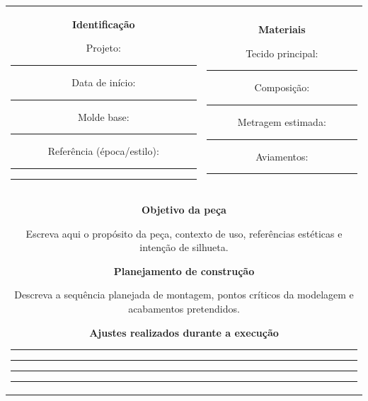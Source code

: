 \documentclass[
  10pt,oneside]{article}
\begin{document}
\begin{center}
\setlength{\tabcolsep}{18pt}
\renewcommand{\arraystretch}{1.15}
\begin{tabular}{cc}

\begin{minipage}[t]{0.47\textwidth}
\normalsize

\textbf{Identificação}

\vspace{0.3cm}

Projeto: \rule{6cm}{0.4pt}  

Data de início: \rule{4cm}{0.4pt}  

Molde base: \rule{6cm}{0.4pt}  

Referência (época/estilo): \rule{3cm}{0.4pt}

\rule{6cm}{0.4pt}

\vspace{1cm}

\end{minipage}
&
\begin{minipage}[t]{0.47\textwidth}
\normalsize

\textbf{Materiais}

\vspace{0.3cm}

Tecido principal: \rule{5cm}{0.4pt}  

Composição: \rule{6cm}{0.4pt}  

Metragem estimada: \rule{4cm}{0.4pt}  

Aviamentos: \rule{6cm}{0.4pt}

\end{minipage}

\\[2cm]

\multicolumn{2}{c}{
\begin{minipage}[t]{0.95\textwidth}
\normalsize

\textbf{Objetivo da peça}

\vspace{0.3cm}

Escreva aqui o propósito da peça, contexto de uso, referências estéticas e intenção de silhueta.

\vspace{0.8cm}

\textbf{Planejamento de construção}

\vspace{0.3cm}

Descreva a sequência planejada de montagem, pontos críticos da modelagem e acabamentos pretendidos.

\vspace{0.8cm}

\textbf{Ajustes realizados durante a execução}

\vspace{0.3cm}

\rule{15cm}{0.4pt}  

\rule{15cm}{0.4pt}  

\rule{15cm}{0.4pt}  

\rule{15cm}{0.4pt}

\end{minipage}
}

\end{tabular}
\end{center}
\end{document}
